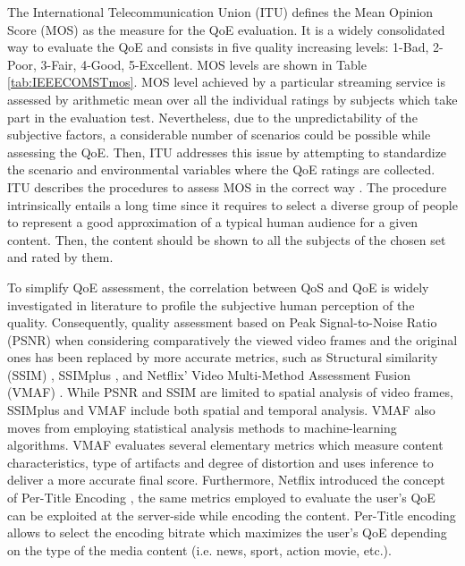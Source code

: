 The International Telecommunication Union (ITU) defines the Mean Opinion Score (MOS) \cite{Itu2016} as the measure for the QoE evaluation. It is a widely consolidated way to evaluate the QoE and consists in five quality increasing levels: 1-Bad, 2-Poor, 3-Fair, 4-Good, 5-Excellent. MOS levels are shown in Table \ref{tab:IEEECOMSTmos}. MOS level achieved by a particular streaming service is assessed by arithmetic mean over all the individual ratings by subjects which take part in the evaluation test. Nevertheless, due to the unpredictability of the subjective factors, a considerable number of scenarios could be possible while assessing the QoE. Then, ITU addresses this issue by attempting to standardize the scenario and environmental variables where the QoE ratings are collected. ITU describes the procedures to assess MOS in the correct way \cite{Itu2016-2}. The procedure intrinsically entails a long time since it requires to select a diverse group of people to represent a good approximation of a typical human audience for a given content. Then, the content should be shown to all the subjects of the chosen set and rated by them.

To simplify QoE assessment, the correlation between QoS and QoE is widely investigated in literature \cite{Kim2010, Alreshoodi2013} to profile the subjective human perception of the quality. Consequently, quality assessment based on Peak \hbox{Signal-to-Noise} Ratio (PSNR) when considering comparatively the viewed video frames and the original ones has been replaced by more accurate metrics, such as Structural similarity (SSIM) \cite{Wang2004}, SSIMplus \cite{Rehman2015}, and Netflix' Video Multi-Method Assessment Fusion (VMAF) \cite{vmaf2016}. While PSNR and SSIM are limited to spatial analysis of video frames, SSIMplus and VMAF include both spatial and temporal analysis. VMAF also moves from employing statistical analysis methods to machine-learning algorithms. VMAF evaluates several elementary metrics which measure content characteristics, type of artifacts and degree of distortion and uses inference to deliver a more accurate final score. Furthermore, Netflix introduced the concept of Per-Title Encoding \cite{PerTitle2015}, the same metrics employed to evaluate the user's QoE can be exploited at the server-side while encoding the content. Per-Title encoding allows to select the encoding bitrate which maximizes the user's QoE depending on the type of the media content (i.e. news, sport, action movie, etc.).

